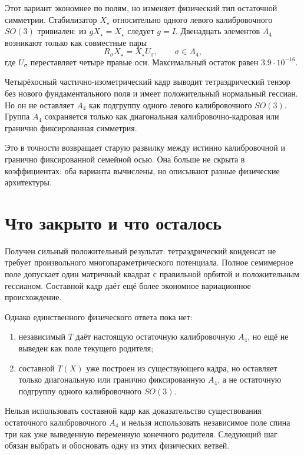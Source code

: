 Этот вариант экономнее по полям, но изменяет физический тип остаточной
симметрии. Стабилизатор $X_\star$ относительно одного левого
калибровочного $SO(3)$ тривиален: из $gX_\star=X_\star$ следует $g=I$.
Двенадцать элементов $A_4$ возникают только как совместные пары
\begin{equation}
 R_\sigma X_\star=X_\star U_\sigma,
 \qquad \sigma\in A_4,
 \label{eq:v6-diagonal-tetrahedral-frame}
\end{equation}
где $U_\sigma$ переставляет четыре правые оси. Максимальный остаток
равен $3.9\cdot10^{-16}$.

\begin{proposition}
Четырёхосный частично-изометрический кадр выводит тетраэдрический тензор
без нового фундаментального поля и имеет положительный нормальный
гессиан. Но он не оставляет $A_4$ как подгруппу одного левого
калибровочного $SO(3)$. Группа $A_4$ сохраняется только как диагональная
калибровочно-кадровая или гранично фиксированная симметрия.
\end{proposition}

Это в точности возвращает старую развилку между истинно калибровочной и
гранично фиксированной семейной осью. Она больше не скрыта в коэффициентах:
оба варианта вычислены, но описывают разные физические архитектуры.

\section{Что закрыто и что осталось}

Получен сильный положительный результат: тетраэдрический конденсат не
требует произвольного многопараметрического потенциала. Полное
семимерное поле допускает один матричный квадрат с правильной орбитой и
положительным гессианом. Составной кадр даёт ещё более экономное
вариационное происхождение.

Однако единственного физического ответа пока нет:
\begin{enumerate}
 \item независимый $T$ даёт настоящую остаточную калибровочную $A_4$, но
 ещё не выведен как поле текущего родителя;
 \item составной $T(X)$ уже построен из существующего кадра, но оставляет
 только диагональную или гранично фиксированную $A_4$, а не остаточную
 подгруппу одного калибровочного $SO(3)$.
\end{enumerate}

\begin{nogocriterion}
Нельзя использовать составной кадр как доказательство существования
остаточного калибровочного $A_4$ и нельзя использовать независимое поле
спина три как уже выведенную переменную конечного родителя. Следующий шаг
обязан выбрать и обосновать одну из этих физических ветвей.
\end{nogocriterion}

